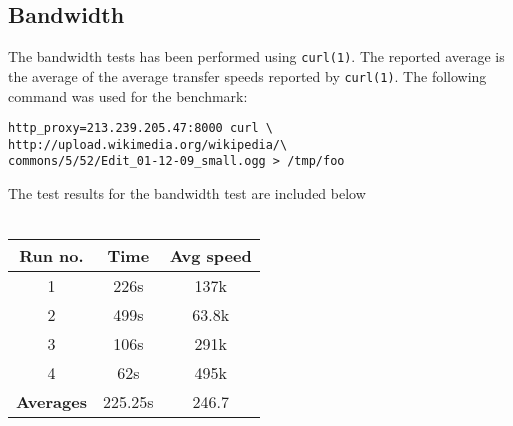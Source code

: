 \documentclass{sig-alternate}
\begin{document}
\subsection{Bandwidth}
The bandwidth tests has been performed using \verb!curl(1)!. The
reported average is the average of the average transfer speeds
reported by \verb!curl(1)!. The following command was used for the
benchmark: 

\begin{verbatim}
http_proxy=213.239.205.47:8000 curl \
http://upload.wikimedia.org/wikipedia/\
commons/5/52/Edit_01-12-09_small.ogg > /tmp/foo
\end{verbatim}

The test results for the bandwidth test are included below
\\
\\
\begin{tabular}{|c|c|c|}
\hline
\textbf{Run no.} & \textbf{Time} & \textbf{Avg  speed} \\
\hline
1 & 226s & 137k  \\
\hline
2 & 499s & 63.8k \\
\hline
3 & 106s & 291k \\
\hline
4 & 62s  & 495k \\
\hline
\textbf{Averages} & 225.25s & 246.7 \\
\hline
\end{tabular}



%
%


%


\end{document}
